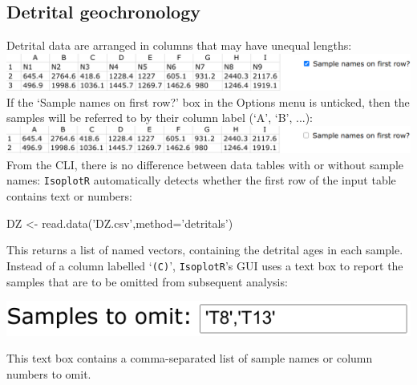\begin{refsection}

\chapter{Detrital geochronology}\label{ch:detrital-R}

Detrital data are arranged in columns that may have unequal lengths:\\

\noindent\includegraphics[width=\linewidth]{../figures/detritalInputTable.png}\\

If the `Sample names on first row?' box in the Options menu is
unticked, then the samples will be referred to by their column label
(`A', `B', ...):\\

\noindent\includegraphics[width=\linewidth]{../figures/detritalInputTableWithoutNames.png}\\

From the CLI, there is no difference between data tables with or
without sample names: \texttt{IsoplotR} automatically detects whether
the first row of the input table contains text or numbers:

\begin{console}
DZ <- read.data('DZ.csv',method='detritals')
\end{console}

This returns a list of named vectors, containing the detrital ages in
each sample. Instead of a column labelled `\texttt{(C)}',
\texttt{IsoplotR}'s GUI uses a text box to report the samples that are
to be omitted from subsequent analysis:

\noindent\begin{minipage}[t]{.4\linewidth}
\strut\vspace*{-\baselineskip}\newline
\includegraphics[width=\linewidth]{../figures/detritalOmit.png}
\end{minipage}
\begin{minipage}[t]{.6\linewidth}
This text box contains a comma-separated list of sample names or
column numbers to omit.
\end{minipage}


\end{refsection}
